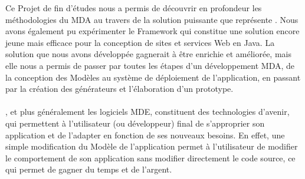 Ce Projet de fin d'études nous a permis de découvrir en profondeur les méthodologies du MDA au travers de la solution puissante que représente \kwacceleo. Nous avons également pu expérimenter le Framework \kwplay qui constitue une solution encore jeune mais efficace pour la conception de sites et services Web en Java. La solution que nous avons développée gagnerait à être enrichie et améliorée, mais elle nous a permis de passer par toutes les étapes d'un développement MDA, de la conception des Modèles au système de déploiement de l'application, en passant par la création des générateurs et l'élaboration d'un prototype.
\\
\\
\kwacceleo{}, et plus généralement les logiciels MDE, constituent des technologies d'avenir, qui permettent à l'utilisateur (ou développeur) final de s'approprier son application et de l'adapter en fonction de ses nouveaux besoins. En effet, une simple modification du Modèle de l'application permet à l'utilisateur de modifier le comportement de son application sans modifier directement le code source, ce qui permet de gagner du temps et de l'argent.



